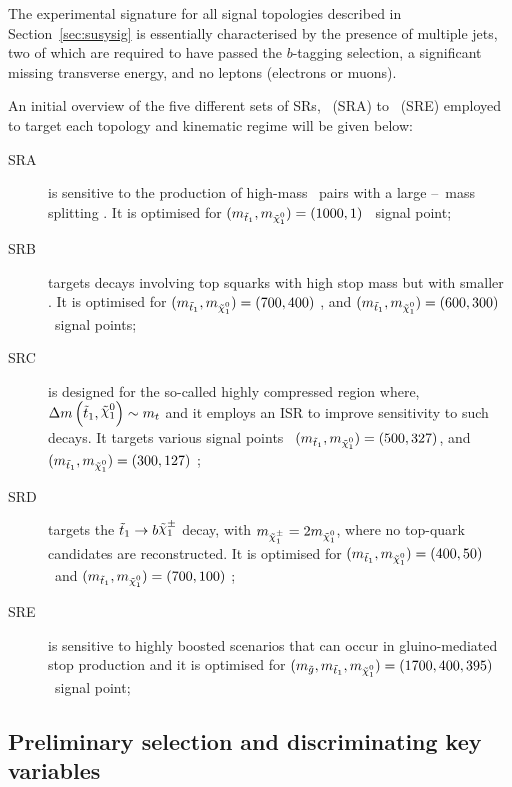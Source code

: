 		The experimental signature for all signal topologies described in Section~\ref{sec:susysig} is essentially characterised by the presence of multiple jets, two of which are required to have passed the $b$-tagging selection, a significant missing transverse energy, and no leptons (electrons or muons).  

		An initial overview of the five different sets of \acp{SR}, \SRA\ (SRA) to \SRE\ (SRE) employed to target each topology and kinematic regime will be given below: 
		
		\begin{description}
			\item [SRA] is sensitive to the production of high-mass \stop\ pairs with a large \stop--\ninoone\ mass splitting \dmstopnino. It is optimised for $(\mstopone, \mninoone) = (1000,1)$ \GeV\ signal point;
			\item [SRB] targets decays involving top squarks with high stop mass but with smaller \dmstopnino. It is optimised for $(\mstopone, \mninoone) = (700, 400)$ \GeV, and $(\mstopone, \mninoone) = (600, 300)$ \GeV\ signal points;
			\item [SRC] is designed for the so-called highly compressed region where, $\dmstopnino \sim m_t$ and it employs an \ac{ISR} to improve sensitivity to such decays. It targets various signal points \eg\ $(\mstopone, \mninoone) = (500, 327)$, and $(\mstopone, \mninoone) = (300, 127)$ \GeV; 
			\item [SRD] targets the $\stopone \to b \chinoonepm$ decay, with $\mchinoonepm = 2\mninoone$, where no top-quark candidates are reconstructed. It is optimised for $(\mstopone, \mninoone) = (400,50)$ \GeV\ and $(\mstopone, \mninoone) = (700,100)$ \GeV; 
			\item [SRE] is sensitive to highly boosted scenarios that can occur in gluino-mediated stop production and it is optimised for $(\mgluino, \mstopone, \mninoone) = (1700, 400, 395)$ \GeV\ signal point;
		\end{description}

		\subsection{Preliminary selection and discriminating key variables}
		\label{sec:vars_used}

